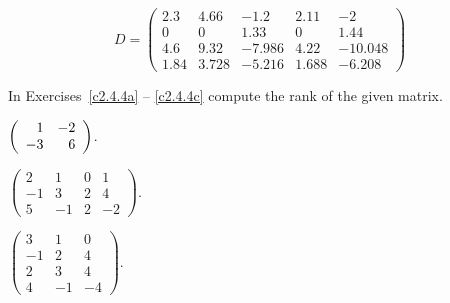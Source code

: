 \documentclass{ximera}
\begin{document}
\begin{exercise} \label{c2.4.3d}
\begin{equation*}
D = \left(\begin{array}{rrrr|r}
    2.3 &  4.66  & -1.2   & 2.11  & -2 \\
         0  &   0  &  1.33  &   0  &  1.44\\
    4.6  &  9.32  & -7.986   & 4.22  & -10.048\\
    1.84  &  3.728 & -5.216   & 1.688 & -6.208
\end{array}\right)
\end{equation*}
\end{exercise}

\noindent In Exercises~\ref{c2.4.4a} -- \ref{c2.4.4c} compute the rank of
the given matrix.
\begin{exercise} \label{c2.4.4a}
$\left(\begin{array}{rr} 1 & -2\\ -3 &6\end{array}\right)$.
\end{exercise}
\begin{exercise} \label{c2.4.4b}
$\left(\begin{array}{rrrr} 2 & 1 & 0 & 1\\
	-1 & 3 & 2 & 4\\ 5 & -1 & 2 & -2\end{array}\right)$.
\end{exercise}
\begin{exercise} \label{c2.4.4c}
$\left(\begin{array}{rrr} 3 & 1 & 0 \\
	-1 & 2 & 4\\ 2 & 3 & 4 \\ 4 & -1 & -4 \end{array}\right)$.
\end{exercise}
\end{document}
